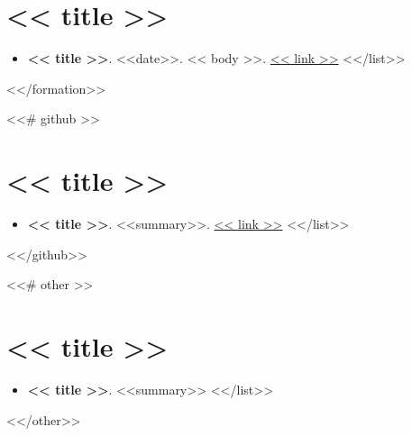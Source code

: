 \documentclass[<<fontsize>>]{article}
\providecommand{\tightlist}{%
  \setlength{\itemsep}{0pt}\setlength{\parskip}{0pt}}
\begin{document}
\section{<< title >>}

\begin{itemize}
  \tightlist
  <<# list >>
    \item \textbf{<< title >>}. <<date>>. << body >>. \url{<< link >>}
  <</list>>
\end{itemize}
<</formation>>


<<# github >>
\section{<< title >>}

\begin{itemize}
  \tightlist
  <<# list >>
    \item \textbf{<< title >>}. <<summary>>. \url{<< link >>}
  <</list>>
\end{itemize}
<</github>>


<<# other >>
\section{<< title >>}

\begin{itemize}
  \tightlist
  <<# list >>
    \item \textbf{<< title >>}. <<summary>>
  <</list>>
\end{itemize}
<</other>>
\end{document}
